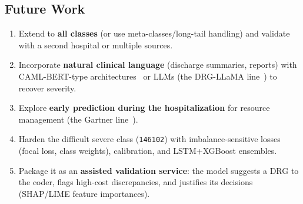 \documentclass{ieeeaccess}
\begin{document}
\subsection{Future Work}
\begin{enumerate}
  \item Extend to \textbf{all classes} (or use meta-classes/long-tail handling) and validate with a second hospital or multiple sources.
  \item Incorporate \textbf{natural clinical language} (discharge summaries, reports) with CAML-BERT-type architectures~\cite{b4,b5} or LLMs (the DRG-LLaMA line~\cite{b6}) to recover severity.
  \item Explore \textbf{early prediction during the hospitalization} for resource management (the Gartner line~\cite{b3}).
  \item Harden the difficult severe class (\texttt{146102}) with imbalance-sensitive losses (focal loss, class weights), calibration, and LSTM+XGBoost ensembles.
  \item Package it as an \textbf{assisted validation service}: the model suggests a DRG to the coder, flags high-cost discrepancies, and justifies its decisions (SHAP/LIME feature importances).
\end{enumerate}
\end{document}
